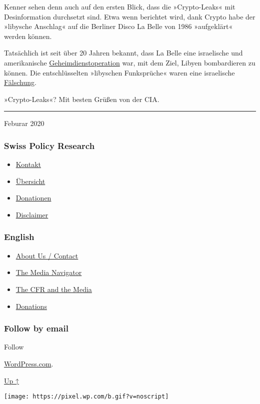 Kenner sehen denn auch auf den ersten Blick, dass die »Crypto-Leaks« mit
Desinformation durchsetzt sind. Etwa wenn berichtet wird, dank Crypto
habe der »libysche Anschlag« auf die Berliner Disco La Belle von 1986
»aufgeklärt« werden können.

Tatsächlich ist seit über 20 Jahren bekannt, dass La Belle eine
israelische und ameri­ka­nische
\href{https://www.wsws.org/de/articles/1998/08/bell-a28.html}{Geheim­dienst­operation}
war, mit dem Ziel, Libyen bombardieren zu können. Die entschlüsselten
»libyschen Funksprüche« waren eine israelische
\href{http://ariwatch.com/OurAlly/Libya.htm}{Fälschung}.

»Crypto-Leaks«? Mit besten Grüßen von der CIA.

\begin{center}\rule{0.5\linewidth}{\linethickness}\end{center}

Feburar 2020

\hypertarget{swiss-policy-research}{%
\subsubsection{Swiss Policy Research}\label{swiss-policy-research}}

\begin{itemize}
\tightlist
\item
  \href{https://swprs.org/kontakt/}{Kontakt}
\item
  \href{https://swprs.org/uebersicht/}{Übersicht}
\item
  \href{https://swprs.org/donationen/}{Donationen}
\item
  \href{https://swprs.org/disclaimer/}{Disclaimer}
\end{itemize}

\hypertarget{english}{%
\subsubsection{English}\label{english}}

\begin{itemize}
\tightlist
\item
  \href{https://swprs.org/contact/}{About Us / Contact}
\item
  \href{https://swprs.org/media-navigator/}{The Media Navigator}
\item
  \href{https://swprs.org/the-american-empire-and-its-media/}{The CFR
  and the Media}
\item
  \href{https://swprs.org/donations/}{Donations}
\end{itemize}

\hypertarget{follow-by-email}{%
\subsubsection{Follow by email}\label{follow-by-email}}

Follow

\href{https://wordpress.com/?ref=footer_custom_com}{WordPress.com}.

\protect\hyperlink{}{Up ↑}

\texttt{[image: https://pixel.wp.com/b.gif?v=noscript]}

